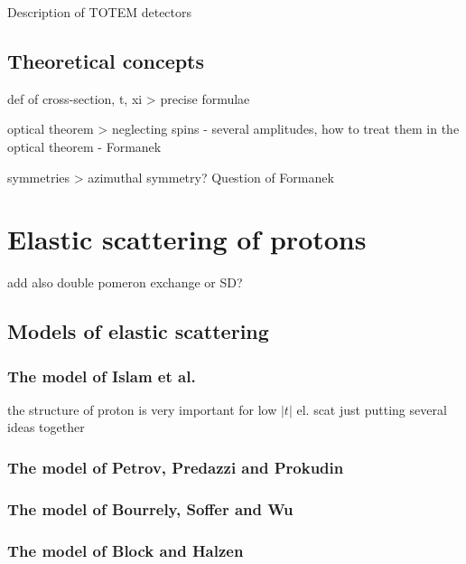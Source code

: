 \> Description of TOTEM detectors

\section{Theoretical concepts}

\> def of cross-section, t, xi
\>> precise formulae

\> optical theorem
\>> neglecting spins - several amplitudes, how to treat them in the optical theorem - Formanek

\> symmetries
\>> azimuthal symmetry? Question of Formanek


\chapter{Elastic scattering of protons}

\> add also double pomeron exchange or SD?

\section{Models of elastic scattering}

\subsection{The model of Islam et al.}


\> the structure of proton is very important for low $|t|$ el. scat
\> just putting several ideas together

\subsection{The model of Petrov, Predazzi and Prokudin}


\subsection{The model of Bourrely, Soffer and Wu}


\subsection{The model of Block and Halzen}

